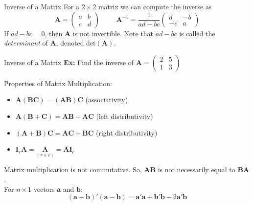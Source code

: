 \documentclass[11pt]{beamer}
\begin{document}
\begin{frame}{Inverse of a Matrix}
For a $2 \times 2$ matrix we can compute the inverse as
\[
\bm{A} =
\begin{pmatrix}
a & b\\
c & d
\end{pmatrix}
\hspace{1cm}
\bm{A}^{-1} = \frac{1}{ad-bc}
\begin{pmatrix}
d & -b\\
-c & a
\end{pmatrix}
\]
If $ad-bc = 0$, then $\bm{A}$ is not invertible.  Note that $ad-bc$ is called the \emph{determinant} of $\bm{A}$, denoted det$(\bm{A})$.
\end{frame}

\begin{frame}{Inverse of a Matrix}
\vspace{-3.5cm}
\textbf{Ex:}  Find the inverse of $\bm{A} = 
\begin{pmatrix}
2 & 5\\
1 & 3
\end{pmatrix}$\\
\end{frame}

\begin{frame}
Properties of Matrix Multiplication:
\vspace{10pt}
\begin{itemize}
\item $\bm{A}(\bm{B}\bm{C}) = (\bm{A}\bm{B})\bm{C}$ (associativity)
\vspace{5pt}
\item $\bm{A}(\bm{B} + \bm{C}) = \bm{A}\bm{B} + \bm{A}\bm{C}$ (left distributivity)
\vspace{5pt}
\item $(\bm{A} + \bm{B})\bm{C} = \bm{A}\bm{C} + \bm{B}\bm{C}$ (right distributivity)
\vspace{5pt}
\item $\bm{I}_r \bm{A} = \underset{(r \times c)}{\bm{A}} = \bm{A}\bm{I}_c$
\end{itemize}
\vspace{5pt}
Matrix multiplication is not commutative.  So, $\bm{A}\bm{B}$ is not necessarily equal to $\bm{B}\bm{A}$.\\ 
\vspace{10pt}
For $n \times 1$ vectors $\bm{a}$ and $\bm{b}$:
$$ (\bm{a} - \bm{b})' (\bm{a} - \bm{b}) = \bm{a'}\bm{a} + \bm{b'}\bm{b} - 2 \bm{a'}\bm{b} $$
\end{frame}
\end{document}
